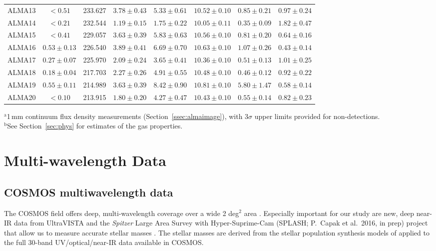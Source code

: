 \documentclass[a4paper,fleqn,usenatbib]{mnras}
\begin{document}
\begin{table*}
\begin{tabular}{cccccccc}
ALMA13 & $<0.51$ & 233.627 & $ 3.78 \pm 0.43$ & $ 5.33 \pm 0.61$ & $10.52 \pm 0.10$ & $ 0.85 \pm 0.21$ & $ 0.97 \pm 0.24$\\ 
ALMA14 & $<0.21$ & 232.544 & $ 1.19 \pm 0.15$ & $ 1.75 \pm 0.22$ & $10.05 \pm 0.11$ & $ 0.35 \pm 0.09$ & $ 1.82 \pm 0.47$\\ 
ALMA15 & $<0.41$ & 229.057 & $ 3.63 \pm 0.39$ & $ 5.83 \pm 0.63$ & $10.56 \pm 0.10$ & $ 0.81 \pm 0.20$ & $ 0.64 \pm 0.16$\\ 
ALMA16 & $0.53 \pm 0.13$ & 226.540 & $ 3.89 \pm 0.41$ & $ 6.69 \pm 0.70$ & $10.63 \pm 0.10$ & $ 1.07 \pm 0.26$ & $ 0.43 \pm 0.14$\\ 
ALMA17 & $0.27 \pm 0.07$ & 225.970 & $ 2.09 \pm 0.24$ & $ 3.65 \pm 0.41$ & $10.36 \pm 0.10$ & $ 0.51 \pm 0.13$ & $ 1.01 \pm 0.25$\\ 
ALMA18 & $0.18 \pm 0.04$ & 217.703 & $ 2.27 \pm 0.26$ & $ 4.91 \pm 0.55$ & $10.48 \pm 0.10$ & $ 0.46 \pm 0.12$ & $ 0.92 \pm 0.22$\\ 
ALMA19 & $0.55 \pm 0.11$ & 214.989 & $ 3.63 \pm 0.39$ & $ 8.42 \pm 0.90$ & $10.81 \pm 0.10$ & $ 5.80 \pm 1.47$ & $ 0.58 \pm 0.14$\\ 
ALMA20 & $<0.10$ & 213.915 & $ 1.80 \pm 0.20$ & $ 4.27 \pm 0.47$ & $10.43 \pm 0.10$ & $ 0.55 \pm 0.14$ & $ 0.82 \pm 0.23$\\ 


\hline
\end{tabular}
\begin{flushleft}
$^{\mathrm{a}}$1\,mm continuum flux density measurements (Section~\ref{ssec:almaimage}), with 3$\sigma$ upper limits provided for non-detections. \\
$^{\mathrm{b}}$See Section~\ref{sec:phys} for estimates of the gas properties.\\
\end{flushleft}
\end{table*}



\section{Multi-wavelength Data}\label{sec:data}

\subsection{COSMOS multiwavelength data}\label{sec:cosmos}

The COSMOS field offers deep, multi-wavelength coverage over a wide 2 deg$^{2}$ area \citep{2007ApJS..172....1S}. Especially important for our study are new, deep near-IR data from UltraVISTA \citep{2012A&A...544A.156M} and the {\em Spitzer} Large Area Survey with Hyper-Suprime-Cam (SPLASH; P.\ Capak et al.\ 2016, in prep) project that allow us to measure accurate stellar masses \citep{2016arXiv160402350L}. The stellar masses are derived from the stellar population synthesis models of \citet{2003MNRAS.344.1000B} applied to the full 30-band UV/optical/near-IR data available in COSMOS.
\end{document}

